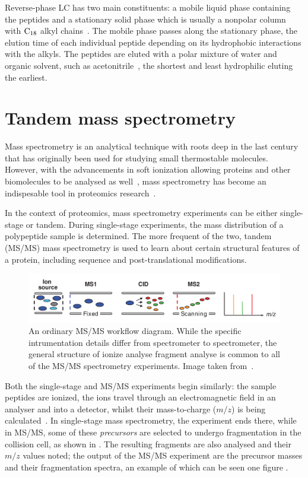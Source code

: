 Reverse-phase LC has two main constituents: a mobile liquid phase containing the peptides and a stationary solid phase which is usually a nonpolar column with \(\ce{C18}\) alkyl chains~\cite{chang1976high}. The mobile phase passes along the stationary phase, the elution time of each individual peptide depending on its hydrophobic interactions with the alkyls. The peptides are eluted with a polar mixture of water and organic solvent, such as acetonitrile~\cite{frohlich2006proteome}, the shortest and least hydrophilic eluting the earliest.


\section{Tandem mass spectrometry}

Mass spectrometry is an analytical technique with roots deep in the last century that has originally been used for studying small thermostable molecules. However, with the advancements in soft ionization allowing proteins and other biomolecules to be analysed as well~\cite{fenn1989electrospray}, mass spectrometry has become an indispesable tool in proteomics research~\cite{collins2003human}.

In the context of proteomics, mass spectrometry experiments can be either single-stage or tandem. During single-stage experiments, the mass distribution of a polypeptide sample is determined. The more frequent of the two, tandem (MS/MS) mass spectrometry is used to learn about certain structural features of a protein, including sequence and post-translational modifications.

\begin{figure}
  \centering
  \includegraphics[width=.9\linewidth]{img/msms-workflow.png}
  \caption{An ordinary MS/MS workflow diagram. While the specific intrumentation details differ from spectrometer to spectrometer, the general structure of ionize \textrightarrow{} analyse \textrightarrow{} fragment \textrightarrow{} analyse is common to all of the MS/MS spectrometry experiments. Image taken from~\citet{domon2006mass}.}\label{fig:mass-spectrometry-workflow}
\end{figure}

Both the single-stage and MS/MS experiments begin similarly: the sample peptides are ionized, the ions travel through an electromagnetic field in an analyser and into a detector, whilst their mass-to-charge (\(m/z\)) is being calculated~\cite{gross2006mass}. In single-stage mass spectrometry, the experiment ends there, while in MS/MS, some of these \emph{precursors} are selected to undergo fragmentation in the collision cell, as shown in . The resulting fragments are also analysed and their \(m/z\) values noted; the output of the MS/MS experiment are the precursor masses and their fragmentation spectra, an example of which can be seen one figure .

